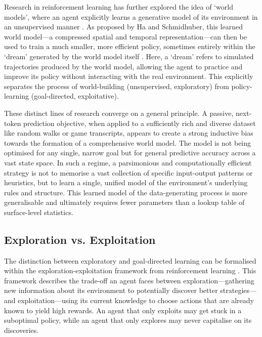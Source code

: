 Research in reinforcement learning has further explored the idea of `world models', where an agent explicitly learns a generative model of its environment in an unsupervised manner \citep{MATSUO2022267,ha}. As proposed by Ha and Schmidhuber, this learned world model—a compressed spatial and temporal representation—can then be used to train a much smaller, more efficient policy, sometimes entirely within the `dream' generated by the world model itself \citep{ha}. Here, a `dream' refers to simulated trajectories produced by the world model, allowing the agent to practice and improve its policy without interacting with the real environment. This explicitly separates the process of world-building (unsupervised, exploratory) from policy-learning (goal-directed, exploitative).

These distinct lines of research converge on a general principle. A passive, next-token prediction objective, when applied to a sufficiently rich and diverse dataset like random walks or game transcripts, appears to create a strong inductive bias towards the formation of a comprehensive world model. The model is not being optimised for any single, narrow goal but for general predictive accuracy across a vast state space. In such a regime, a parsimonious and computationally efficient strategy is not to memorise a vast collection of specific input-output patterns or heuristics, but to learn a single, unified model of the environment's underlying rules and structure. This learned model of the data-generating process is more generalisable and ultimately requires fewer parameters than a lookup table of surface-level statistics.

\subsection{Exploration vs. Exploitation}

The distinction between exploratory and goal-directed learning can be formalised within the exploration-exploitation framework from reinforcement learning \citep{explorationexploitation}. This framework describes the trade-off an agent faces between exploration—gathering new information about its environment to potentially discover better strategies—and exploitation—using its current knowledge to choose actions that are already known to yield high rewards. An agent that only exploits may get stuck in a suboptimal policy, while an agent that only explores may never capitalise on its discoveries.

